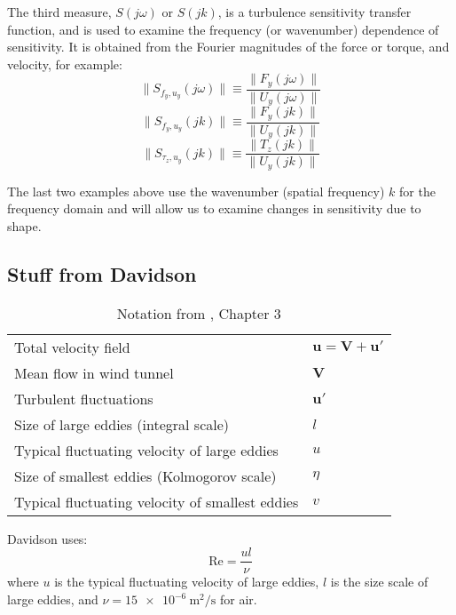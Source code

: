 The third measure, $S(j\omega)$ or $S(jk)$, is a turbulence sensitivity transfer function, and is used to examine the frequency (or wavenumber) dependence of sensitivity.  It is obtained from the Fourier magnitudes of the force or torque, and velocity, for example: 
\begin{equation}
\| S_{f_y,u_y}(j\omega) \| \equiv \frac{\| F_y(j\omega) \|}{\| U_y(j\omega) \|}  
\end{equation}
\begin{equation}
\| S_{f_y,u_y}(jk) \| \equiv \frac{\| F_y(jk) \|}{\| U_y(jk) \|}  
\end{equation}
\begin{equation}
\| S_{\tau_z,u_y}(jk) \| \equiv \frac{\| T_z(jk) \|}{\| U_y(jk) \|}  
\end{equation}

The last two examples above use the wavenumber (spatial frequency) $k$ for the frequency domain and will allow us to examine changes in sensitivity due to shape. 

\subsection{Stuff from Davidson}

\begin{table}
\caption{Notation from \cite{Davidson:2004}, Chapter 3}
\begin{tabular}{ll}
Total velocity field & $\mathbf{u} = \mathbf{V}+\mathbf{u'}$ \\
Mean flow in wind tunnel & $\mathbf{V}$ \\
Turbulent fluctuations & $\mathbf{u'}$ \\
Size of large eddies (integral scale) & $l$ \\
Typical fluctuating velocity of large eddies & $u$ \\
Size of smallest eddies (Kolmogorov scale) & $\eta$ \\
Typical fluctuating velocity of smallest eddies & $v$ \\
\end{tabular}
\end{table}

Davidson uses:
\begin{equation}
\mbox{Re} = \frac{u l}{\nu}
\end{equation}
where $u$ is the typical fluctuating velocity of large eddies, $l$ is the size scale of large eddies, and $\nu = \SI{15e-6}{\meter\squared\per\second}$ for air. 

